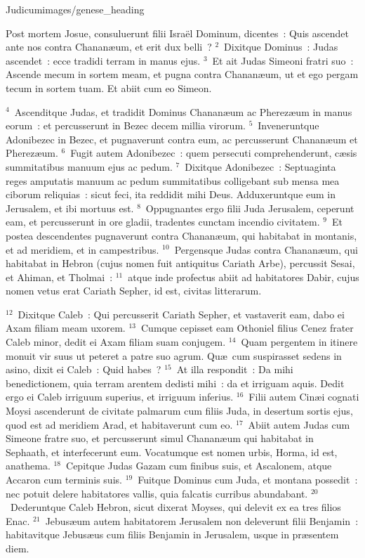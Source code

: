 {Judicum}{images/genese_heading}


\bchapter
\lettrine[lines=6,image=true,loversize=0.05,lraise=-0.03]{P}{}ost mortem Josue, consuluerunt filii Isra\"el Dominum, dicentes~: Quis ascendet ante nos contra Chanan\ae um, et erit dux belli~?
${}^{2}$~Dixitque Dominus~: Judas ascendet~: ecce tradidi terram in manus ejus.
${}^{3}$~Et ait Judas Simeoni fratri suo~: Ascende mecum in sortem meam, et pugna contra Chanan\ae um, ut et ego pergam tecum in sortem tuam. Et abiit cum eo Simeon.


${}^{4}$~Ascenditque Judas, et tradidit Dominus Chanan\ae um ac Pherez\ae um in manus eorum~: et percusserunt in Bezec decem millia virorum.
${}^{5}$~Inveneruntque Adonibezec in Bezec, et pugnaverunt contra eum, ac percusserunt Chanan\ae um et Pherez\ae um.
${}^{6}$~Fugit autem Adonibezec~: quem persecuti comprehenderunt, c\ae sis summitatibus manuum ejus ac pedum.
${}^{7}$~Dixitque Adonibezec~: Septuaginta reges amputatis manuum ac pedum summitatibus colligebant sub mensa mea ciborum reliquias~: sicut feci, ita reddidit mihi Deus. Adduxeruntque eum in Jerusalem, et ibi mortuus est.
${}^{8}$~Oppugnantes ergo filii Juda Jerusalem, ceperunt eam, et percusserunt in ore gladii, tradentes cunctam incendio civitatem.
${}^{9}$~Et postea descendentes pugnaverunt contra Chanan\ae um, qui habitabat in montanis, et ad meridiem, et in campestribus.
${}^{10}$~Pergensque Judas contra Chanan\ae um, qui habitabat in Hebron (cujus nomen fuit antiquitus Cariath Arbe), percussit Sesai, et Ahiman, et Tholmai~:
${}^{11}$~atque inde profectus abiit ad habitatores Dabir, cujus nomen vetus erat Cariath Sepher, id est, civitas litterarum.


${}^{12}$~Dixitque Caleb~: Qui percusserit Cariath Sepher, et vastaverit eam, dabo ei Axam filiam meam uxorem.
${}^{13}$~Cumque cepisset eam Othoniel filius Cenez frater Caleb minor, dedit ei Axam filiam suam conjugem.
${}^{14}$~Quam pergentem in itinere monuit vir suus ut peteret a patre suo agrum. Qu\ae\ cum suspirasset sedens in asino, dixit ei Caleb~: Quid habes~?
${}^{15}$~At illa respondit~: Da mihi benedictionem, quia terram arentem dedisti mihi~: da et irriguam aquis. Dedit ergo ei Caleb irriguum superius, et irriguum inferius.
${}^{16}$~Filii autem Cin\ae i cognati Moysi ascenderunt de civitate palmarum cum filiis Juda, in desertum sortis ejus, quod est ad meridiem Arad, et habitaverunt cum eo.
${}^{17}$~Abiit autem Judas cum Simeone fratre suo, et percusserunt simul Chanan\ae um qui habitabat in Sephaath, et interfecerunt eum. Vocatumque est nomen urbis, Horma, id est, anathema.
${}^{18}$~Cepitque Judas Gazam cum finibus suis, et Ascalonem, atque Accaron cum terminis suis.
${}^{19}$~Fuitque Dominus cum Juda, et montana possedit~: nec potuit delere habitatores vallis, quia falcatis curribus abundabant.
${}^{20}$~Dederuntque Caleb Hebron, sicut dixerat Moyses, qui delevit ex ea tres filios Enac.
${}^{21}$~Jebus\ae um autem habitatorem Jerusalem non deleverunt filii Benjamin~: habitavitque Jebus\ae us cum filiis Benjamin in Jerusalem, usque in pr\ae sentem diem.


